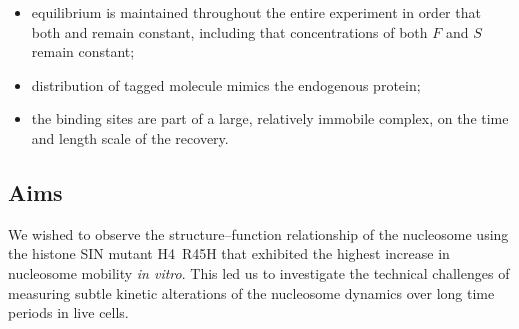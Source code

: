     \begin{itemize}
      \item equilibrium is maintained throughout the entire experiment in
            order that both \Kon{} and \Koff{} remain constant,
            including that concentrations of both $F$ and $S$ remain constant;
      \item distribution of tagged molecule mimics the endogenous protein;
      \item the binding sites are part of a large, relatively immobile complex,
            on the time and length scale of the recovery.
    \end{itemize}

  \subsection{Aims}

    We wished to observe the structure--function relationship of the nucleosome
    using the histone SIN mutant H4~R45H that exhibited the
    highest increase in nucleosome mobility \textit{in vitro}.
    This led us to investigate the technical challenges of measuring subtle kinetic
    alterations of the nucleosome dynamics over long time periods in live cells.
